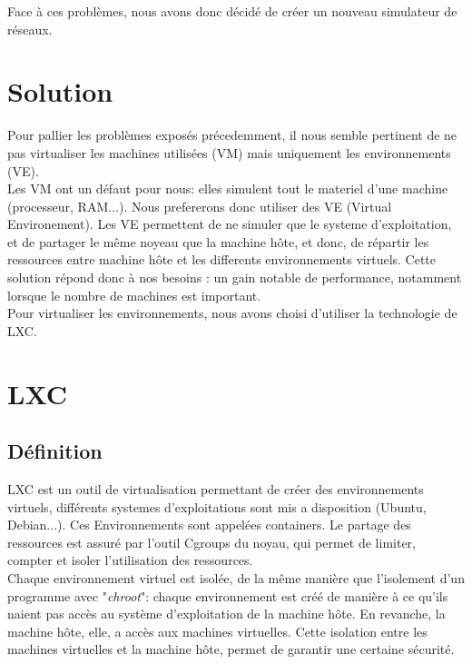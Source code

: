\documentclass[a4paper]{article}
\begin{document}
Face à ces probl\`emes, nous avons donc d\'ecid\'e de cr\'eer un nouveau simulateur de r\'eseaux.

\section{Solution}
Pour pallier les probl\`emes expos\'es pr\'ecedemment, il nous semble pertinent de ne pas virtualiser les
machines utilis\'ees  (VM) mais uniquement les environnements (VE).\\

Les VM ont un d\'efaut pour nous: elles simulent tout le materiel d'une machine (processeur, RAM...).
Nous prefererons donc utiliser des VE (Virtual Environement). Les VE permettent de ne simuler que le
systeme d'exploitation, et de partager le m\^eme noyeau que la machine h\^ote, et donc, de r\'epartir les
ressources entre machine h\^ote et les differents environnements virtuels. Cette solution répond donc
à nos besoins : un gain notable de performance, notamment lorsque le nombre de machines est
important.\\

Pour virtualiser les environnements, nous avons choisi d'utiliser la technologie de LXC.

\section{LXC}
\subsection{D\'efinition}

LXC est un outil de virtualisation permettant de cr\'eer des environnements virtuels, diff\'erents systemes
d'exploitations sont mis a disposition (Ubuntu, Debian...). Ces Environnements sont appel\'ees containers. Le
partage des ressources est assur\'e par l'outil Cgroups du noyau, qui permet de limiter, compter et
isoler l'utilisation des ressources.\\

Chaque environnement virtuel est isol\'ee, de la m\^eme mani\`ere que l'isolement d'un programme 
avec "\emph{chroot}": chaque environnement est cr\'e\'e de mani\`ere \`a ce qu'ils naient pas acc\`es au syst\`eme 
d'exploitation de la machine h\^ote. En revanche, la machine h\^ote, elle, a acc\`es aux machines virtuelles.
Cette isolation entre les machines virtuelles et la machine h\^ote, permet de garantir une certaine s\'ecurit\'e.\\
\end{document}
